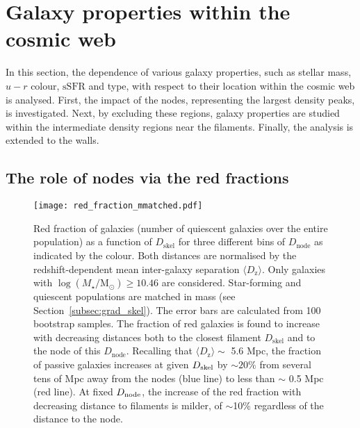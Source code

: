\documentclass[useAMS,usenatbib]{mnras}
\newcommand{\Mstardot}{M\ensuremath{_{\star}} / \mathrm{M}\ensuremath{_{\odot}}}
\newcommand{\ssfr}{$\mbox{sSFR}$\xspace}
\begin{document}
\section{Galaxy properties within the  cosmic web} %
\label{sec:mass_segregation}

In this section, the dependence of various galaxy properties, such as stellar mass, $u - r$ colour, \ssfr and type, with respect to their location within the cosmic web is analysed. 
First, the impact of the nodes, representing the largest density peaks, is investigated. 
Next, by excluding these regions, galaxy properties are studied within the intermediate density regions near the filaments.
Finally, the analysis is extended to the walls.


\subsection{The role of nodes via the red fractions}
\label{subsec:red_frac}

\begin{figure}
\texttt{[image: red\_fraction\_mmatched.pdf]}
\caption{Red fraction of galaxies (number of quiescent galaxies over the entire population) as a function of $D_{\mathrm{skel}}$ for three different bins of $D_{\mathrm{node}}$ as indicated by the colour. Both distances are normalised by the redshift-dependent mean inter-galaxy separation $\langle D_{\mathrm{z}} \rangle$.
Only galaxies with $\log(\Mstardot) \geq 10.46$ are considered. Star-forming and quiescent populations are matched in mass (see Section~\ref{subsec:grad_skel}). The error bars are calculated from 100 bootstrap samples. The fraction of red galaxies is found to increase with decreasing distances both to the closest filament $D_{\mathrm{skel}}$ and to the node of this $D_{\mathrm{node}}$. 
Recalling that $\langle D_{\mathrm{z}} \rangle \sim$ 5.6 Mpc, the fraction of passive galaxies increases at given $D_{\rm skel}$ by $\sim 20\%$ from several tens of Mpc away from the nodes (blue line) to less than $\sim$ 0.5 Mpc (red line). At fixed $D_{\rm node}$, the increase of the red fraction with decreasing distance to filaments is milder, of $\sim$10\% regardless of the distance to the node.
}
\label{Fig:red_frac}
\end{figure}
\end{document}
